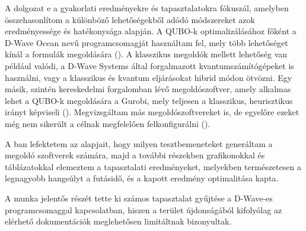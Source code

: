A dolgozat e a gyakorlati eredményekre és tapasztalatokra fókuszál, amelyben összehasonlítom a különböző lehetőségekből adódó módszereket azok eredményessége és hatékonysága alapján.
A QUBO-k optimalizálásához főként a D-Wave Ocean nevű programcsomagját használtam fel, mely több lehetőséget kínál a formulák megoldására (). A klasszikus megoldók mellett lehetőség van például valódi, a D-Wave Systems által forgalmazott kvantumszámítógépeket is használni, vagy a klasszikus és kvantum eljárásokat hibrid módon ötvözni.
Egy másik, szintén kereskedelmi forgalomban lévő megoldószoftver, amely alkalmas lehet a QUBO-k megoldására a Gurobi, mely teljesen a klasszikus, heurisztikus irányt képviseli (). Megvizsgáltam más megoldószoftvereket is, de egyelőre ezeket még nem sikerült a célnak megfelelően felkonfigurálni ().

A ban lefektetem az alapjait, hogy milyen tesztbemeneteket generáltam a megoldó szoftverek számára, majd a további részekben grafikonokkal és táblázatokkal elemeztem a tapasztalati eredményeket, melyekben természetesen a legnagyobb hangsúlyt a futásidő, és a kapott eredmény optimalitása kapta.

A munka jelentős részét tette ki számos tapasztalat gyűjtése a D-Wave-es programcsomaggal kapcsolatban, hiszen a terület újdonságából kifolyólag az elérhető dokumentációk meglehetősen limitáltnak bizonyultak.